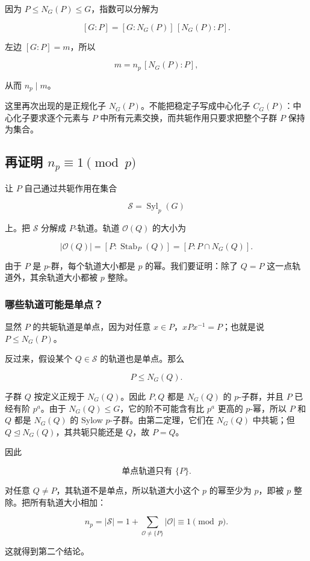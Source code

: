 因为 $P\le N_G(P)\le G$，指数可以分解为

\[
[G:P]=[G:N_G(P)]\,[N_G(P):P].
\]

左边 $[G:P]=m$，所以

\[
m=n_p\,[N_G(P):P],
\]

从而 $n_p\mid m$。

这里再次出现的是正规化子 $N_G(P)$。不能把稳定子写成中心化子 $C_G(P)$：中心化子要求逐个元素与 $P$ 中所有元素交换，而共轭作用只要求把整个子群 $P$ 保持为集合。

\subsection{再证明 $n_p\equiv1\pmod p$}


让 $P$ 自己通过共轭作用在集合

\[
\mathcal S=\operatorname{Syl}_p(G)
\]

上。把 $\mathcal S$ 分解成 $P$-轨道。轨道 $\mathcal O(Q)$ 的大小为

\[
|\mathcal O(Q)|=[P:\operatorname{Stab}_P(Q)]
=[P:P\cap N_G(Q)].
\]

由于 $P$ 是 $p$-群，每个轨道大小都是 $p$ 的幂。我们要证明：除了 $Q=P$ 这一点轨道外，其余轨道大小都被 $p$ 整除。

\subsubsection{哪些轨道可能是单点？}


显然 $P$ 的共轭轨道是单点，因为对任意 $x\in P$，$xPx^{-1}=P$；也就是说 $P\le N_G(P)$。

反过来，假设某个 $Q\in\mathcal S$ 的轨道也是单点。那么

\[
P\le N_G(Q).
\]

子群 $Q$ 按定义正规于 $N_G(Q)$。因此 $P,Q$ 都是 $N_G(Q)$ 的 $p$-子群，并且 $P$ 已经有阶 $p^a$。由于 $N_G(Q)\le G$，它的阶不可能含有比 $p^a$ 更高的 $p$-幂，所以 $P$ 和 $Q$ 都是 $N_G(Q)$ 的 Sylow $p$-子群。由第二定理，它们在 $N_G(Q)$ 中共轭；但 $Q\trianglelefteq N_G(Q)$，其共轭只能还是 $Q$，故 $P=Q$。

因此

\[
\text{单点轨道只有 }\{P\}.
\]

对任意 $Q\ne P$，其轨道不是单点，所以轨道大小这个 $p$ 的幂至少为 $p$，即被 $p$ 整除。把所有轨道大小相加：

\[
n_p=|\mathcal S|
=1+\sum_{\mathcal O\ne\{P\}}|\mathcal O|
\equiv1\pmod p.
\]

这就得到第二个结论。

